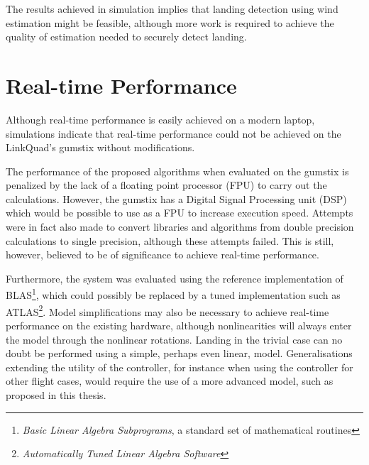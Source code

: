         The results achieved in simulation implies that landing detection
        using wind estimation might be feasible, although more work is required
        to achieve the quality of estimation needed to securely detect landing.
\pagebreak
    \section{Real-time Performance}
        Although real-time performance is easily achieved on a modern laptop,
        simulations indicate that real-time performance
        could not be achieved on the LinkQuad's gumstix without modifications.

        The performance of the proposed algorithms when evaluated on the
        gumstix is penalized by the lack of a floating point processor (FPU) to
        carry out the calculations. However, the gumstix has a
        Digital Signal Processing unit (DSP) which would be possible to
        use as a FPU to increase execution speed.
        Attempts were in fact also made to convert libraries and algorithms from
        double precision calculations to single precision, although these attempts failed.
        This is still, however, believed to be of significance to achieve real-time performance.

        Furthermore, the system was evaluated
        using the reference implementation of BLAS\footnote{\textit{Basic Linear Algebra Subprograms},
        a standard set of mathematical routines}, which could possibly
        be replaced by a tuned implementation such as ATLAS\footnote{\textit{Automatically Tuned Linear Algebra Software}}.
        Model simplifications may also be necessary to achieve real-time performance
        on the existing hardware, although nonlinearities will always enter the model
        through the nonlinear rotations.
        Landing in the trivial case can no doubt be performed using a simple, perhaps even linear, model.
        Generalisations extending the utility of the controller, for instance when
        using the controller for other flight cases, would require the use
        of a more advanced model, such as proposed in this thesis.
